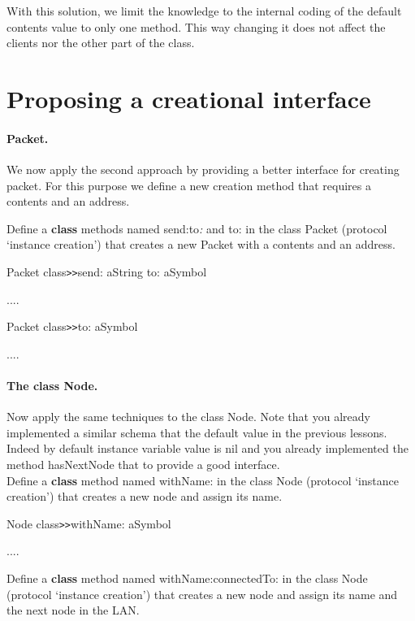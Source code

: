 With this solution, we limit the knowledge to the internal coding 
of the default contents value to only one method. This way changing 
it does not affect the clients nor the other part of the class. 




\section{Proposing a creational interface}


\paragraph{Packet.}
We now apply the second approach by providing a better interface 
for creating packet. For this purpose we define a new creation 
method that requires a contents and an address.

Define a \textbf{class} methods named send:to\textit{:} and to: in the class Packet 
(protocol `instance creation') that creates a new Packet with a 
contents and an address. 

\begin{code}
Packet class\texttt{>>}send: aString to: aSymbol

....

Packet class\texttt{>>}to: aSymbol

....
\end{code}



\paragraph{The class Node.}

Now apply the same techniques to the class Node. Note that you 
already implemented a similar schema that the default value in 
the previous lessons. Indeed by default instance variable value 
is nil and you already implemented the method hasNextNode that 
to provide a good interface. \\
Define a \textbf{class} method named withName: in the class Node (protocol 
`instance creation') that creates a new node and assign its name.

\begin{code}
Node class\texttt{>>}withName: aSymbol

....
\end{code}

Define a \textbf{class} method named withName:connectedTo: in the class Node 
(protocol `instance creation') that creates a new node and assign 
its name and the next node in the LAN.

